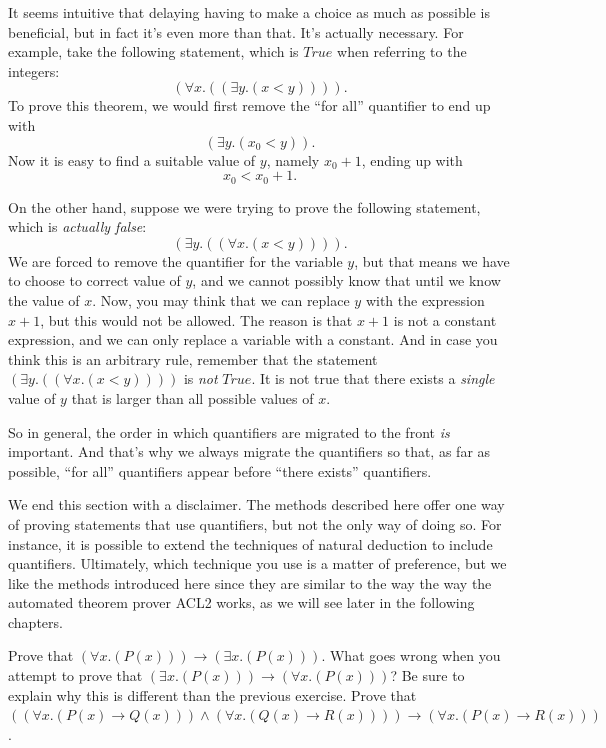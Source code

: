 {{It seems intuitive that delaying having to make a choice as much as possible is
beneficial, but in fact it's even more than that. It's actually necessary. For example,
take the following statement, which is $True$ when referring to the integers:
$$(\forall x.((\exists y.(x < y)))).$$
To prove this theorem, we would first remove the ``for all'' quantifier to end up with
$$(\exists y.(x_0 < y)).$$
Now it is easy to find a suitable value of $y$, namely $x_0+1$, ending up with
$$x_0 < x_0 + 1.$$

On the other hand, suppose we were trying to prove the following statement, which
is \emph{actually false}:
$$(\exists y.((\forall x.(x < y)))).$$
We are forced to remove the quantifier for the variable $y$, but that means we have
to choose to correct value of $y$, and we cannot possibly know that until we know
the value of $x$.
Now, you may think that we can replace $y$ with the expression $x+1$, but this would
not be allowed. The reason is that $x+1$ is not a constant expression, and we can
only replace a variable with a constant. And in case you think this is an arbitrary
rule, remember that the statement $(\exists y.((\forall x.(x < y))))$ is \emph{not}
$True$. It is not true that there exists a \emph{single} value of $y$ that is larger
than all possible values of $x$.

So in general, the order in which quantifiers are migrated to the front \emph{is} 
important. And that's why we always migrate the quantifiers so that, as far as
possible, ``for all'' quantifiers appear before ``there exists'' quantifiers.

We end this section with a disclaimer. The methods described here offer one way of
proving statements that use quantifiers, but not the only way of doing so. For
instance, it is possible to extend the techniques of natural deduction to include
quantifiers. Ultimately, which technique you use is a matter of preference, but
we like the methods introduced here since they are similar to the way the way the
automated theorem prover ACL2 works, as we will see later in the following chapters.

\begin{ExerciseList}
\Exercise Prove that $(\forall x.(P(x))) \rightarrow (\exists x.(P(x)))$.
\Exercise What goes wrong when you attempt to prove that $(\exists x.(P(x))) \rightarrow (\forall x.(P(x)))$? Be sure to explain
    why this is different than the previous exercise.
\Exercise Prove that $((\forall x.(P(x) \rightarrow Q(x))) \wedge (\forall x.(Q(x) \rightarrow R(x)))) \rightarrow (\forall x.(P(x) \rightarrow R(x)))$.
\end{ExerciseList}

}}
